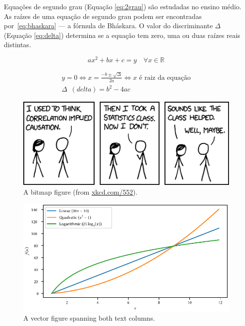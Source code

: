 \documentclass[english,notblind]{sbc20}
\begin{document}
Equações de segundo grau (Equação \ref{eq:2grau}) são estudadas no ensino
médio. As raízes de uma equação de segundo grau podem ser encontradas
por~\eqref{eq:bhaskara} --- a fórmula de Bháskara. O valor do discriminante
$\Delta$ (Equação \ref{eq:delta}) determina se a equação tem zero, uma ou
duas raízes reais distintas.

\begin{equation}
  \label{eq:2grau}
  ax^2+bx+c=y \quad \forall x \in \mathbb{R}
\end{equation}

\begin{gather}
  \label{eq:bhaskara}
    y=0 \Leftrightarrow x=\frac{-b \pm \sqrt{\Delta}}{2a}
    \Leftrightarrow x \text{ é raiz da equação}\\
  \label{eq:delta}
    \Delta\enspace(\mathit{delta}) = b^2-4ac
\end{gather}

\begin{figure}
  \centering
  \includegraphics[width=\columnwidth]{figures/xkcd_552_correlation}
   \caption{A bitmap figure (from \url{xkcd.com/552}).\label{fig:xkcd-correlation}}
\end{figure}

\begin{figure}[b]
  \centering
  \includegraphics{figures/graph-functions}
  \caption{A vector figure spanning both text columns.\label{fig:graph-functions}}
\end{figure}
\end{document}
